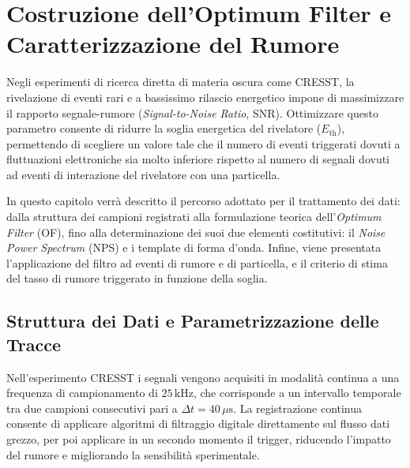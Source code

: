 \chapter{Costruzione dell'Optimum Filter e Caratterizzazione del Rumore}
\label{ch:OF}

Negli esperimenti di ricerca diretta di materia oscura come CRESST, la rivelazione di eventi rari e a bassissimo rilascio energetico impone di massimizzare il rapporto segnale-rumore (\textit{Signal-to-Noise Ratio}, SNR). Ottimizzare questo parametro consente di ridurre la soglia energetica del rivelatore ($E_{\text{th}}$), 
permettendo di scegliere un valore tale che il numero di eventi triggerati dovuti a fluttuazioni elettroniche sia molto inferiore rispetto al numero di segnali dovuti ad eventi di interazione del rivelatore con una particella.

In questo capitolo verrà descritto il percorso adottato per il trattamento dei dati: dalla struttura dei campioni registrati alla formulazione teorica dell'\textit{Optimum Filter} (OF), fino alla determinazione dei suoi due elementi costitutivi: il \textit{Noise Power Spectrum} (NPS) e i template di forma d'onda. Infine, viene presentata l'applicazione del filtro ad eventi di rumore e di particella, e il criterio di stima del tasso di rumore triggerato in funzione della soglia.

\section{Struttura dei Dati e Parametrizzazione delle Tracce}
\label{sec:struttura_dati}

Nell'esperimento CRESST i segnali vengono acquisiti in modalità continua a una frequenza di campionamento di $25\,\text{kHz}$, che corrisponde a un intervallo temporale tra due campioni consecutivi pari a $\Delta t = 40\,\mu\text{s}$. La registrazione continua consente di applicare algoritmi di filtraggio digitale direttamente sul flusso dati grezzo, per poi applicare in un secondo momento il trigger, riducendo l'impatto del rumore e migliorando la sensibilità sperimentale.

